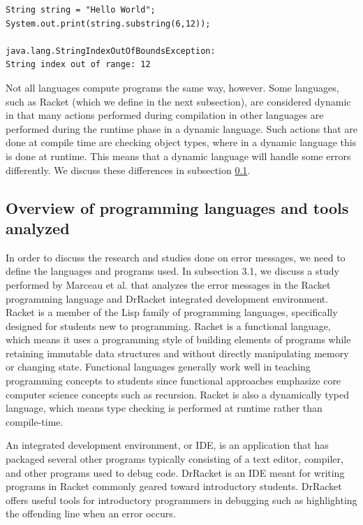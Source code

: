 \documentclass{sig-alternate}
\begin{document}
\begin{verbatim}
String string = "Hello World";
System.out.print(string.substring(6,12));

java.lang.StringIndexOutOfBoundsException:
String index out of range: 12
\end{verbatim}

Not all languages compute programs the same way, however.
Some languages, such as Racket (which we define in the next subsection), are considered dynamic in that many actions performed during compilation in other languages are performed during the runtime phase in a dynamic language.
Such actions that are done at compile time are checking object types, where in a dynamic language this is done at runtime.
This means that a dynamic language will handle some errors differently.
We discuss these differences in subsection \ref{subsec:languages}.


\subsection{Overview of programming languages and tools analyzed}\label{subsec:languages}

In order to discuss the research and studies done on error messages, we need to define the languages and programs used.
In subsection 3.1, we discuss a study performed by Marceau et al. that analyzes the error messages in the Racket programming language and DrRacket integrated development environment.
Racket is a member of the Lisp family of programming languages, specifically designed for students new to programming.
Racket is a functional language, which means it uses a programming style of building elements of programs while retaining immutable data structures 
and without directly manipulating memory or changing state.
Functional languages generally work well in teaching programming concepts to students since functional approaches emphasize core computer science concepts such as recursion. 
Racket is also a dynamically typed language, which means type checking is performed at runtime rather than compile-time.


An integrated development environment, or IDE, is an application that has packaged several other programs typically consisting of a text editor, compiler, and other programs used to debug code.
DrRacket is an IDE meant for writing programs in Racket commonly geared toward introductory students.
DrRacket offers useful tools for introductory programmers in debugging such as highlighting the offending line when an error occurs. 
\end{document}
